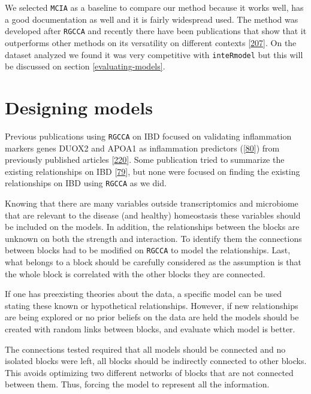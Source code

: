 \documentclass[
  a4paper,
]{book}
\begin{document}
We selected \texttt{MCIA} as a baseline to compare our method because it works well, has a good documentation as well and it is fairly widespread used.
The method was developed after \texttt{RGCCA} and recently there have been publications that show that it outperforms other methods on its versatility on different contexts {[}\protect\hyperlink{ref-cantini2021}{207}{]}.
On the dataset analyzed we found it was very competitive with \texttt{inteRmodel} but this will be discussed on section \ref{evaluating-models}.

\hypertarget{designing-models}{%
\section{Designing models}\label{designing-models}}

Previous publications using \texttt{RGCCA} on IBD focused on validating inflammation markers genes DUOX2 and APOA1 as inflammation predictors ({[}\protect\hyperlink{ref-tang2017}{80}{]}) from previously published articles {[}\protect\hyperlink{ref-haberman2014}{220}{]}.
Some publication tried to summarize the existing relationships on IBD {[}\protect\hyperlink{ref-hasler_uncoupling_2016}{79}{]}, but none were focused on finding the existing relationships on IBD using \texttt{RGCCA} as we did.

Knowing that there are many variables outside transcriptomics and microbiome that are relevant to the disease (and healthy) homeostasis these variables should be included on the models.
In addition, the relationships between the blocks are unknown on both the strength and interaction.
To identify them the connections between blocks had to be modified on \texttt{RGCCA} to model the relationships.
Last, what belongs to a block should be carefully considered as the assumption is that the whole block is correlated with the other blocks they are connected.

If one has preexisting theories about the data, a specific model can be used stating these known or hypothetical relationships.
However, if new relationships are being explored or no prior beliefs on the data are held the models should be created with random links between blocks, and evaluate which model is better.

The connections tested required that all models should be connected and no isolated blocks were left, all blocks should be indirectly connected to other blocks.
This avoids optimizing two different networks of blocks that are not connected between them.
Thus, forcing the model to represent all the information.
\end{document}
